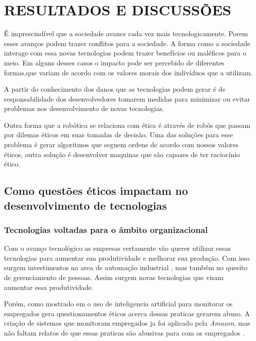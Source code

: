 \section{RESULTADOS E DISCUSSÕES}

É imprescindível que a sociedade avance cada vez mais tecnologicamente. Porem esses avanços  podem trazer conflitos para a sociedade. A forma como a sociedade interage com essa novas tecnologias podem trazer benefícios ou maléficos para o meio. Em alguns desses casos o impacto pode ser percebido de diferentes formas,que variam de acordo com os valores morais dos indivíduos que a utilizam. 

A partir do conhecimento dos danos que as tecnologias podem gerar é de responsabilidade dos desenvolvedores tomarem medidas para minimizar ou evitar problemas nos desenvolvimento de novas tecnologias.

Outra forma que a robótica se relaciona com ética é através de robôs que passam por dilemas éticos em suas tomadas de decisão. Uma das soluções para esse problema é gerar algoritmos que seguem ordens de acordo com nossos valores éticos, outra solução é desenvolver maquinas que são capazes de ter raciocínio ético.

\subsection{Como questões éticos impactam no desenvolvimento de tecnologias}


\subsubsection{Tecnologias voltadas para o âmbito organizacional}

Com o avanço tecnológico as empresas certamente vão querer utilizar essas tecnologias para aumentar sua produtividade e melhorar sua produção. Com isso surgem investimentos na area de automação industrial \cite{Industri87:online}, mas também no quesito de gerenciamento de pessoas. Assim surgem novas tecnologias que visam aumentar essa produtividade.

Porém, como mostrado em \cite{Telkamp2022} o uso de inteligencia artificial para monitorar os empregados gera questionamentos éticos acerca dessas praticas gerarem abuso. A criação de sistemas que monitoram empregados ja foi aplicado pela \textit{Amazon}, mas não faltam relatos de que essas praticas são abusivas para com os empregados \cite{jef:online} \cite{Amazon:online}. 


